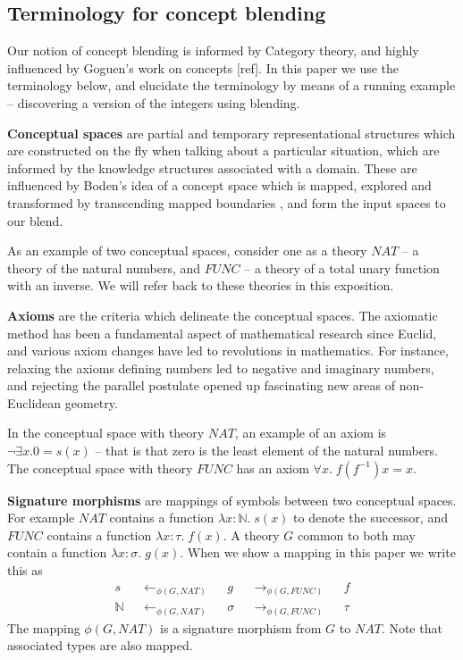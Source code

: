 \subsection{Terminology for concept blending}
Our notion of concept blending is informed by Category theory, and
highly influenced by Goguen's work on concepts [ref]. In this paper we
use the terminology below, and elucidate the terminology by means of a
running example -- discovering a version of the integers using
blending.

{\bf Conceptual spaces} are partial and temporary representational
structures which are constructed on the fly when talking about a
particular situation, which are informed by the knowledge structures
associated with a domain. These are influenced by Boden's idea of a
concept space which is mapped, explored and transformed by
transcending mapped boundaries \cite{boden}, and form the input spaces
to our blend. 

As an example of two conceptual spaces, consider one as a theory $NAT$ --
a theory of the natural numbers, and $FUNC$ -- a theory of a total
unary function with an inverse. We will refer back to these theories
in this exposition.

{\bf Axioms} are the criteria which delineate the conceptual
spaces. The axiomatic method has been a fundamental aspect of
mathematical research since Euclid, and various axiom changes have led
to revolutions in mathematics. For instance, relaxing the axioms
defining numbers led to negative and imaginary numbers, and rejecting
the parallel postulate opened up fascinating new areas of
non-Euclidean geometry.

In the conceptual space with theory $NAT$, an example of an axiom is $\neg \exists x. 0 =
s(x)$ -- that is that zero is the least element of the natural
numbers.  The conceptual space with theory $FUNC$ has an axiom
$\forall x.\;f(f^{-1}) x = x$. 

{\bf Signature morphisms} are mappings of symbols between two
conceptual spaces. For example $NAT$ contains a function $\lambda
x:\mathbb{N}.\;s(x)$ to denote the successor, and $FUNC$ contains a function
$\lambda x:\tau.\;f(x)$. A theory $G$ common to both may contain a function
$\lambda x:\sigma.\;g(x)$. When we show a mapping in this paper we write this
as
\begin{align}
s&&\leftarrow_{\phi(G,NAT)}&&g&&\rightarrow_{\phi(G,FUNC)}&&f\\
\mathbb{N}&&\leftarrow_{\phi(G,NAT)}&&\sigma&&\rightarrow_{\phi(G,FUNC)}&&\tau
\end{align}
\noindent The mapping $\phi(G,NAT)$ is a signature morphism from
$G$ to $NAT$. Note that associated types are also mapped.

